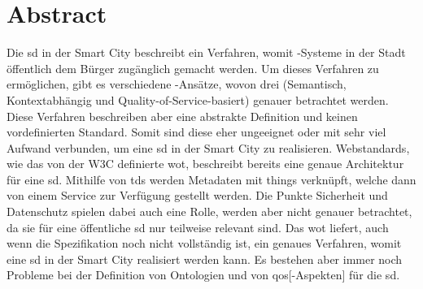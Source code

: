 \section*{Abstract}\label{sec:abstract}

Die \gls{sd} in der Smart City beschreibt ein Verfahren, womit -Systeme in der Stadt öffentlich dem Bürger zugänglich gemacht werden.
Um dieses Verfahren zu ermöglichen, gibt es verschiedene -Ansätze, wovon drei (Semantisch, Kontextabhängig und Quality-of-Service-basiert) genauer betrachtet werden.
Diese Verfahren beschreiben aber eine abstrakte Definition und keinen vordefinierten Standard.
Somit sind diese eher ungeeignet oder mit sehr viel Aufwand verbunden, um eine \gls{sd} in der Smart City zu realisieren.
Webstandards, wie das von der W3C definierte \gls{wot}, beschreibt bereits eine genaue Architektur für eine \gls{sd}.
Mithilfe von \glspl{td} werden Metadaten mit \glspl{thing} verknüpft, welche dann von einem Service zur Verfügung gestellt werden.
Die Punkte Sicherheit und Datenschutz spielen dabei auch eine Rolle, werden aber nicht genauer betrachtet, da sie für eine öffentliche \gls{sd} nur teilweise relevant sind.
Das \gls{wot} liefert, auch wenn die Spezifikation noch nicht vollständig ist, ein genaues Verfahren, womit eine \gls{sd} in der Smart City realisiert werden kann.
Es bestehen aber immer noch Probleme bei der Definition von Ontologien und von \gls{qos}[-Aspekten] für die \gls{sd}.
